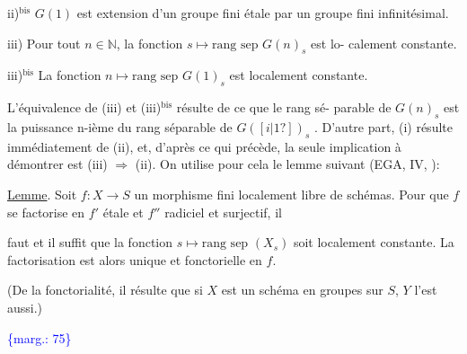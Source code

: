 \documentclass[11pt]{article}
\newcommand{\margin}[1]{\textcolor{blue}{\{\textsf{marg.:} #1\}}}
\newcommand{\uline}[1]{\underline{#1}}
\newcommand{\unsure}[1]{[#1?]}
\newenvironment{diagramblock}{\par\begin{center}}{\end{center}\par}
\begin{document}
ii)$^{\text{bis}}$ $G(1)$ est extension d'un groupe fini étale par un groupe
fini infinitésimal.

iii) Pour tout $n \in \mathbb{N}$, la fonction $s \mapsto \text{rang sep } G(n)_s$ est lo-%
calement constante.

iii)$^{\text{bis}}$ La fonction $n \mapsto \text{rang sep } G(1)_s$ est localement constante.

L'équivalence de (iii) et (iii)$^{\text{bis}}$ résulte de ce que le rang sé-%
parable de $G(n)_s$ est la puissance n-ième du rang séparable de $G(\unsure{i|1})_s$ .
D'autre part, (i) résulte immédiatement de (ii), et, d'après ce qui précède,
la seule implication à démontrer est (iii) $\Rightarrow$ (ii). On utilise pour cela
le lemme suivant (EGA, IV, ):

\uline{Lemme}. Soit $f : X \to S$ un morphisme fini localement libre de schémas.
Pour que $f$ se factorise en $f'$ étale et $f''$ radiciel et surjectif, il
\begin{diagramblock}\end{diagramblock}
faut et il suffit que la fonction $s \mapsto \text{rang sep } (X_s)$
soit localement constante. La factorisation est alors
unique et fonctorielle en $f$.

(De la fonctorialité, il résulte que si $X$ est un schéma en groupes sur
$S$, $Y$ l'est aussi.)

\margin{75}
\end{document}
